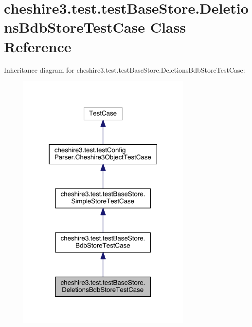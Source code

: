 \hypertarget{classcheshire3_1_1test_1_1test_base_store_1_1_deletions_bdb_store_test_case}{\section{cheshire3.\-test.\-test\-Base\-Store.\-Deletions\-Bdb\-Store\-Test\-Case Class Reference}
\label{classcheshire3_1_1test_1_1test_base_store_1_1_deletions_bdb_store_test_case}
}


Inheritance diagram for cheshire3.\-test.\-test\-Base\-Store.\-Deletions\-Bdb\-Store\-Test\-Case\-:
\nopagebreak
\begin{figure}[H]
\begin{center}
\leavevmode
\includegraphics[width=246pt]{classcheshire3_1_1test_1_1test_base_store_1_1_deletions_bdb_store_test_case__inherit__graph}
\end{center}
\end{figure}


